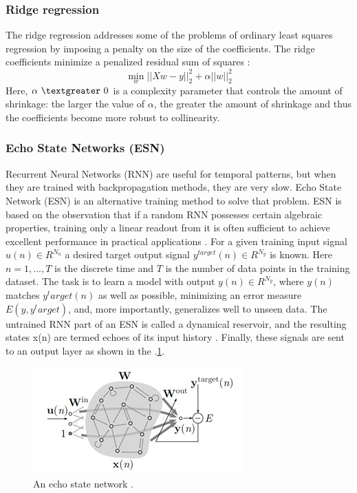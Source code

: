 \documentclass[review]{elsarticle}
\begin{document}
\subsubsection{Ridge regression}
The ridge regression addresses some of the problems of ordinary least squares regression by imposing a penalty on the size of the coefficients. The ridge coefficients minimize a penalized residual sum of squares  \citep{scikitlearn2011}:
$$\min_{w} { \Bigr| \Bigr| Xw - y \Bigr| \Bigr|_2^2  + \alpha \Bigr| \Bigr| w \Bigr| \Bigr|_2^2 } $$
Here, $\alpha \ \textgreater \  0$ is a complexity parameter that controls the amount of shrinkage: the larger the value of $\alpha$, the greater the amount of shrinkage and thus the coefficients become more robust to collinearity.

\subsubsection{Echo State Networks (ESN)}
Recurrent Neural Networks (RNN) are useful for temporal patterns, but when they are trained with backpropagation methods, they are very slow.  Echo State Network (ESN) is an alternative training method to solve that problem.  ESN is based on the observation that if a random RNN possesses certain algebraic properties, training only a linear readout from it is often sufficient to achieve excellent performance in practical applications \citep{Lukose2009}. 
For a given training input signal $u(n)  \in R^{N_u}$ a desired target output signal $y^{target}(n) \in R^{N_y}$
is known. Here $n = 1, . . . ,T$ is the discrete time and $T$ is the number of data points in the training dataset. The task is to learn a model with output $y(n) \in R^{N_y}$, where $y(n)$ matches $y^target(n)$ as well as possible, minimizing an error measure $E(y,y^target)$, and, more importantly, generalizes well to unseen data. The untrained RNN part of an ESN is called a dynamical reservoir, and the resulting states x(n) are termed echoes of its input history \citep{Lukose2012}. Finally, these signals are sent to an output layer as shown in the \figurename
$.$\ref{figura3}.
\begin{figure}[h] 
 \centering
 \includegraphics[scale=.9]{Reservorio}
 \caption{An echo state network \citep{Lukose2012}.} 
 \label{figura3} 
\end{figure}
 
\end{document}
